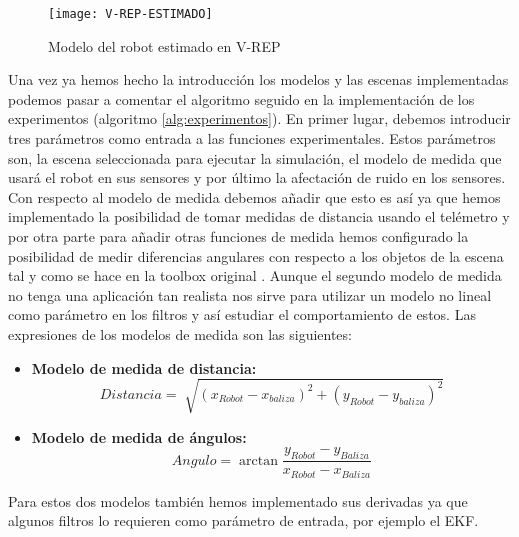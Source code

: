 \begin{figure}[ht!]
\centering
\texttt{[image: V-REP-ESTIMADO]}
\caption{Modelo del robot estimado en V-REP} \label{Modelo_estimado}
\end{figure}

Una vez ya hemos hecho la introducción los modelos y las escenas implementadas podemos pasar a comentar el algoritmo seguido en la implementación de los experimentos (algoritmo \ref{alg:experimentos}).
En primer lugar, debemos introducir tres parámetros como entrada a las funciones experimentales.
Estos parámetros son, la escena seleccionada para ejecutar la simulación, el modelo de medida que usará el robot en sus sensores y por último la afectación de ruido en los sensores.
Con respecto al modelo de medida debemos añadir que esto es así ya que hemos implementado la posibilidad de tomar medidas de distancia usando el telémetro y por otra parte para añadir otras funciones de medida hemos configurado la posibilidad de medir diferencias angulares con respecto a los objetos de la escena tal y como se hace en la toolbox original \cite{toolbox_simo}.
Aunque el segundo modelo de medida no tenga una aplicación tan realista nos sirve para utilizar un modelo no lineal como parámetro en los filtros y así estudiar el comportamiento de estos.
Las expresiones de los modelos de medida son las siguientes:
\begin{itemize}
\item \textbf{Modelo de medida de distancia:}
\begin{equation}
Distancia = \sqrt[]{(x_{Robot}-x_{baliza})^{2}+(y_{Robot}-y_{baliza})^{2}}
\end{equation}\label{Modelo_distancia}
\item \textbf{Modelo de medida de ángulos:}
\begin{equation} \label{Modelo_angulo}
Angulo = \arctan{\frac{y_{Robot}-y_{Baliza}}{x_{Robot}-x_{Baliza}}}
\end{equation}
\end{itemize}
Para estos dos modelos también hemos implementado sus derivadas ya que algunos filtros lo requieren como parámetro de entrada, por ejemplo el \ac{EKF}.

